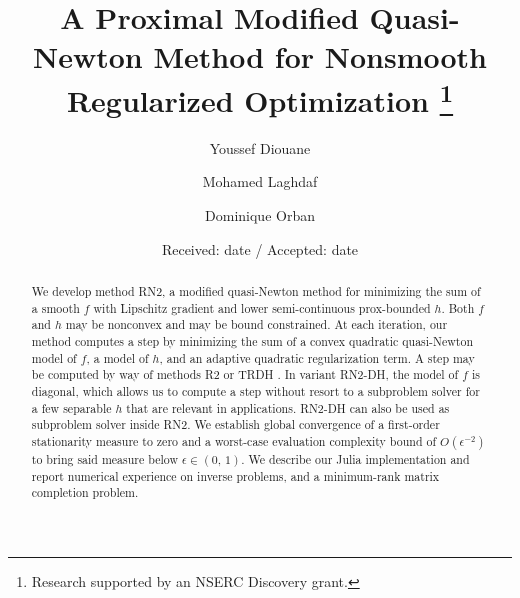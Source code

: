 \documentclass[smallextended]{svjour3}       %
\newcommand{\papertitle}{A Proximal Modified Quasi-Newton Method for Nonsmooth Regularized Optimization}
\begin{document}
\title{%
  \papertitle
  \thanks{Research supported by an NSERC Discovery grant.}%
}


\author{Youssef Diouane \and
        Mohamed Laghdaf \and
        Dominique Orban
}



\date{Received: date / Accepted: date}

\linenumbers
\pagestyle{myheadings}

\maketitle
\thispagestyle{mytitlepage}

\begin{abstract}
  We develop method RN2, a modified quasi-Newton method for minimizing the sum of a smooth \(f\) with Lipschitz gradient and lower semi-continuous prox-bounded \(h\).
  Both \(f\) and \(h\) may be nonconvex and may be bound constrained.
  At each iteration, our method computes a step by minimizing the sum of a convex quadratic quasi-Newton model of \(f\), a model of \(h\), and an adaptive quadratic regularization term. 
  A step may be computed by way of methods R2 \citep{aravkin-baraldi-orban-2022} or TRDH \citep{leconte-orban-2023}.
  In variant RN2-DH, the model of \(f\) is diagonal, which allows us to compute a step without resort to a subproblem solver for a few separable \(h\) that are relevant in applications.
  RN2-DH can also be used as subproblem solver inside RN2.
  We establish global convergence of a first-order stationarity measure to zero and a worst-case evaluation complexity bound of \(O(\epsilon^{-2})\) to bring said measure below \(\epsilon \in (0, \, 1)\).
  We describe our Julia implementation and report numerical experience on inverse problems, and a minimum-rank matrix completion problem.
\end{abstract}
\end{document}
